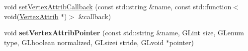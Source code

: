 \textbf{ }\par
\begin{DoxyCompactItemize}
\item 
void \hyperlink{classGLProgramState_a2b0daf0548df92f03a1c42807f5aaab0}{set\+Vertex\+Attrib\+Callback} (const std\+::string \&name, const std\+::function$<$ void(\hyperlink{structVertexAttrib}{Vertex\+Attrib} $\ast$)$>$ \&callback)
\item 
\mbox{\label{classGLProgramState_a0e9bd5f54d62ad8f278ff2d698e013fa}} 
void {\bfseries set\+Vertex\+Attrib\+Pointer} (const std\+::string \&name, G\+Lint size, G\+Lenum type, G\+Lboolean normalized, G\+Lsizei stride, G\+Lvoid $\ast$pointer)
\end{DoxyCompactItemize}

\textbf{ }\par
